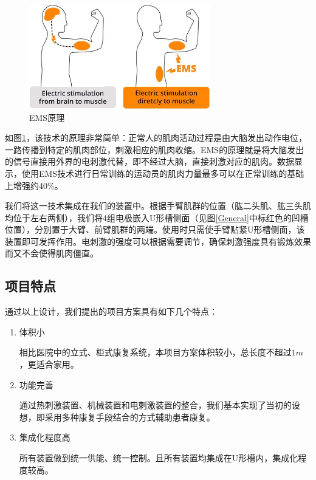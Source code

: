 \documentclass[UTF8]{ctexart}
\begin{document}
            \begin{figure}[H]
                \centering
                \includegraphics[width=0.7\textwidth]{core-technology-ems.jpg}
                \caption{EMS原理}
                \label{fig:EMS}
            \end{figure}
            如图\ref{fig:EMS}，该技术的原理非常简单：正常人的肌肉活动过程是由大脑发出动作电位，一路传播到特定的肌肉部位，刺激相应的肌肉收缩。EMS的原理就是将大脑发出的信号直接用外界的电刺激代替，即不经过大脑，直接刺激对应的肌肉。数据显示，使用EMS技术进行日常训练的运动员的肌肉力量最多可以在正常训练的基础上增强约40\%。

            我们将这一技术集成在我们的装置中。根据手臂肌群的位置（肱二头肌、肱三头肌均位于左右两侧），我们将4组电极嵌入U形槽侧面（见图\ref{General}中标红色的凹槽位置），分别置于大臂、前臂肌群的两端。使用时只需使手臂贴紧U形槽侧面，该装置即可发挥作用。电刺激的强度可以根据需要调节，确保刺激强度具有锻炼效果而又不会使得肌肉僵直。
    \subsection{项目特点}
        通过以上设计，我们提出的项目方案具有如下几个特点：
        \begin{enumerate}
            \item[\textbf{1)}]体积小
             
                相比医院中的立式、柜式康复系统，本项目方案体积较小，总长度不超过$1m$，更适合家用。
            \item[\textbf{2)}] 功能完善
            
                通过热刺激装置、机械装置和电刺激装置的整合，我们基本实现了当初的设想，即采用多种康复手段结合的方式辅助患者康复。 
            \item[\textbf{3)}]集成化程度高
                
                所有装置做到统一供能、统一控制。且所有装置均集成在U形槽内，集成化程度较高。
        \end{enumerate}
\newpage
\end{document}
